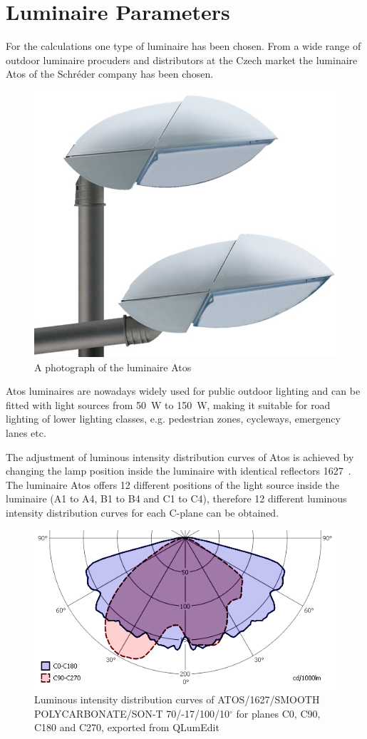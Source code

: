 \section{Luminaire Parameters}
For the calculations one type of luminaire has been chosen. From a wide range of outdoor luminaire procuders and distributors at the Czech market the luminaire Atos of the Schr\'{e}der company has been chosen.

\begin{figure}[htb]
  \centering
  \includegraphics[width=0.7\columnwidth]{Atos}
  \caption{A photograph of the luminaire Atos}
  \label{fig:Atos}
\end{figure}

Atos luminaires are nowadays widely used for public outdoor lighting and can be fitted with light sources from 50~W to 150~W, making it suitable for road lighting of lower lighting classes, e.g. pedestrian zones, cycleways, emergency lanes etc.

The adjustment of luminous intensity distribution curves of Atos is achieved by changing the lamp position inside the luminaire with identical reflectors 1627~\cite{Schreder}. The luminaire Atos offers 12 different positions of the light source inside the luminaire (A1 to A4, B1 to B4 and C1 to C4), therefore 12 different luminous intensity distribution curves for each C-plane can be obtained.

\begin{figure}[htb]
  \centering
  \includegraphics[width=\columnwidth]{70W_A1_v2}
  \caption{Luminous intensity distribution curves of ATOS/1627/SMOOTH POLYCARBONATE/SON-T 70/-17/100/10$^\circ$ for planes C0, C90, C180 and C270, exported from QLumEdit}
  \label{fig:lumIntDistr}
\end{figure}